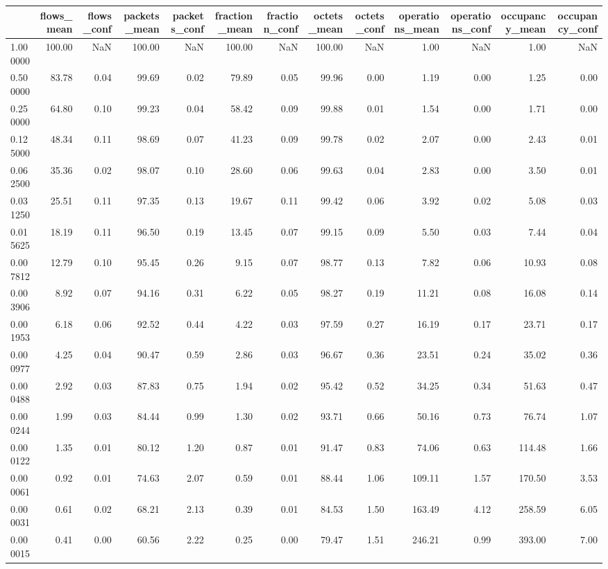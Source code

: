 \begin{tabular}{lrrrrrrrrrrrr}
\toprule
 & flows_mean & flows_conf & packets_mean & packets_conf & fraction_mean & fraction_conf & octets_mean & octets_conf & operations_mean & operations_conf & occupancy_mean & occupancy_conf \\
\midrule
1.000000 & 100.00 & NaN & 100.00 & NaN & 100.00 & NaN & 100.00 & NaN & 1.00 & NaN & 1.00 & NaN \\
0.500000 & 83.78 & 0.04 & 99.69 & 0.02 & 79.89 & 0.05 & 99.96 & 0.00 & 1.19 & 0.00 & 1.25 & 0.00 \\
0.250000 & 64.80 & 0.10 & 99.23 & 0.04 & 58.42 & 0.09 & 99.88 & 0.01 & 1.54 & 0.00 & 1.71 & 0.00 \\
0.125000 & 48.34 & 0.11 & 98.69 & 0.07 & 41.23 & 0.09 & 99.78 & 0.02 & 2.07 & 0.00 & 2.43 & 0.01 \\
0.062500 & 35.36 & 0.02 & 98.07 & 0.10 & 28.60 & 0.06 & 99.63 & 0.04 & 2.83 & 0.00 & 3.50 & 0.01 \\
0.031250 & 25.51 & 0.11 & 97.35 & 0.13 & 19.67 & 0.11 & 99.42 & 0.06 & 3.92 & 0.02 & 5.08 & 0.03 \\
0.015625 & 18.19 & 0.11 & 96.50 & 0.19 & 13.45 & 0.07 & 99.15 & 0.09 & 5.50 & 0.03 & 7.44 & 0.04 \\
0.007812 & 12.79 & 0.10 & 95.45 & 0.26 & 9.15 & 0.07 & 98.77 & 0.13 & 7.82 & 0.06 & 10.93 & 0.08 \\
0.003906 & 8.92 & 0.07 & 94.16 & 0.31 & 6.22 & 0.05 & 98.27 & 0.19 & 11.21 & 0.08 & 16.08 & 0.14 \\
0.001953 & 6.18 & 0.06 & 92.52 & 0.44 & 4.22 & 0.03 & 97.59 & 0.27 & 16.19 & 0.17 & 23.71 & 0.17 \\
0.000977 & 4.25 & 0.04 & 90.47 & 0.59 & 2.86 & 0.03 & 96.67 & 0.36 & 23.51 & 0.24 & 35.02 & 0.36 \\
0.000488 & 2.92 & 0.03 & 87.83 & 0.75 & 1.94 & 0.02 & 95.42 & 0.52 & 34.25 & 0.34 & 51.63 & 0.47 \\
0.000244 & 1.99 & 0.03 & 84.44 & 0.99 & 1.30 & 0.02 & 93.71 & 0.66 & 50.16 & 0.73 & 76.74 & 1.07 \\
0.000122 & 1.35 & 0.01 & 80.12 & 1.20 & 0.87 & 0.01 & 91.47 & 0.83 & 74.06 & 0.63 & 114.48 & 1.66 \\
0.000061 & 0.92 & 0.01 & 74.63 & 2.07 & 0.59 & 0.01 & 88.44 & 1.06 & 109.11 & 1.57 & 170.50 & 3.53 \\
0.000031 & 0.61 & 0.02 & 68.21 & 2.13 & 0.39 & 0.01 & 84.53 & 1.50 & 163.49 & 4.12 & 258.59 & 6.05 \\
0.000015 & 0.41 & 0.00 & 60.56 & 2.22 & 0.25 & 0.00 & 79.47 & 1.51 & 246.21 & 0.99 & 393.00 & 7.00 \\

\end{tabular}
